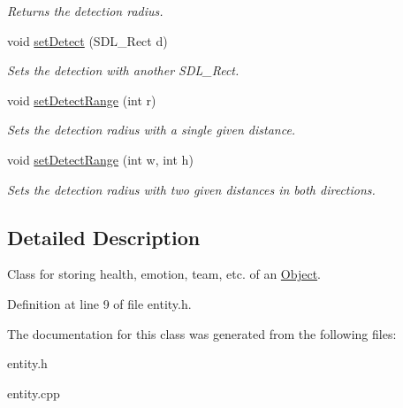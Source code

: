 \begin{DoxyCompactItemize}
\begin{DoxyCompactList}\small\item\em Returns the detection radius. \end{DoxyCompactList}\item 
void \hyperlink{classEntity_a7624a9b21bbb1bd97d7f2eac20339a82}{set\+Detect} (S\+D\+L\+\_\+\+Rect d)\hypertarget{classEntity_a7624a9b21bbb1bd97d7f2eac20339a82}{}\label{classEntity_a7624a9b21bbb1bd97d7f2eac20339a82}

\begin{DoxyCompactList}\small\item\em Sets the detection with another S\+D\+L\+\_\+\+Rect. \end{DoxyCompactList}\item 
void \hyperlink{classEntity_a884a7f8a537f3d0e926dfedb8e88a740}{set\+Detect\+Range} (int r)\hypertarget{classEntity_a884a7f8a537f3d0e926dfedb8e88a740}{}\label{classEntity_a884a7f8a537f3d0e926dfedb8e88a740}

\begin{DoxyCompactList}\small\item\em Sets the detection radius with a single given distance. \end{DoxyCompactList}\item 
void \hyperlink{classEntity_af4b91451301036e4aed029e90a7ba726}{set\+Detect\+Range} (int w, int h)\hypertarget{classEntity_af4b91451301036e4aed029e90a7ba726}{}\label{classEntity_af4b91451301036e4aed029e90a7ba726}

\begin{DoxyCompactList}\small\item\em Sets the detection radius with two given distances in both directions. \end{DoxyCompactList}\end{DoxyCompactItemize}


\subsection{Detailed Description}
Class for storing health, emotion, team, etc. of an \hyperlink{classObject}{Object}. 

Definition at line 9 of file entity.\+h.



The documentation for this class was generated from the following files\+:\begin{DoxyCompactItemize}
\item 
entity.\+h\item 
entity.\+cpp\end{DoxyCompactItemize}
